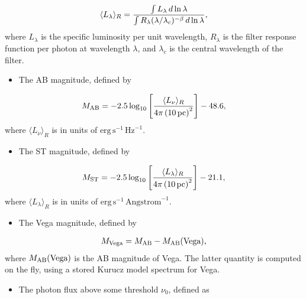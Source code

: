 \documentclass[letterpaper,10pt,english]{sphinxmanual}
\begin{document}
\begin{gather}
\begin{split}\langle L_\lambda\rangle_R = \frac{\int L_\lambda \, d\ln\lambda}{\int R_\lambda (\lambda/\lambda_c)^{-\beta} \, d\ln\lambda},\end{split}\notag
\end{gather}
where \(L_\lambda\) is the specific luminosity per unit wavelength, \(R_\lambda\) is the filter response function per photon at wavelength \(\lambda\), and \(\lambda_c\) is the central wavelength of the filter.
\begin{itemize}
\item {} 
The AB magnitude, defined by

\end{itemize}
\begin{gather}
\begin{split}M_{\rm AB} = -2.5 \log_{10} \left[\frac{\langle L_\nu\rangle_R}{4\pi\left(10\,\mathrm{pc}\right)^2}\right] - 48.6,\end{split}\notag
\end{gather}
where \(\langle L_\nu\rangle_R\) is in units of \(\mathrm{erg\,s}^{-1}\,\mathrm{Hz}^{-1}\).
\begin{itemize}
\item {} 
The ST magnitude, defined by

\end{itemize}
\begin{gather}
\begin{split}M_{\rm ST} = -2.5 \log_{10} \left[\frac{\langle L_\lambda\rangle_R}{4\pi\left(10\,\mathrm{pc}\right)^2}\right] - 21.1,\end{split}\notag
\end{gather}
where \(\langle L_\lambda\rangle_R\) is in units of \(\mathrm{erg\, s}^{-1}\,\mathrm{Angstrom}^{-1}\).
\begin{itemize}
\item {} 
The Vega magnitude, defined by

\end{itemize}
\begin{gather}
\begin{split}M_{\rm Vega} = M_{\rm AB} - M_{\rm AB}(\mbox{Vega}),\end{split}\notag
\end{gather}
where \(M_{\rm AB}(\mbox{Vega})\) is the AB magnitude of Vega. The latter quantity is computed on the fly, using a stored Kurucz model spectrum for Vega.
\begin{itemize}
\item {} 
The photon flux above some threshold \(\nu_0\), defined as

\end{itemize}
\end{document}
